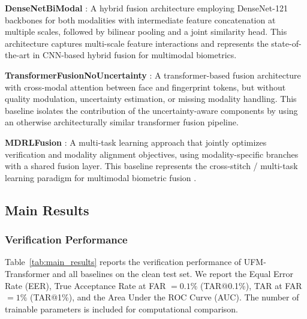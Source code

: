 \documentclass[10pt,journal,compsoc]{IEEEtran}
\begin{document}
\textbf{DenseNetBiModal} \cite{ren2022dataset}: A hybrid fusion architecture employing DenseNet-121 backbones for both modalities with intermediate feature concatenation at multiple scales, followed by bilinear pooling and a joint similarity head. This architecture captures multi-scale feature interactions and represents the state-of-the-art in CNN-based hybrid fusion for multimodal biometrics.

\textbf{TransformerFusionNoUncertainty} \cite{yang2024authformer}: A transformer-based fusion architecture with cross-modal attention between face and fingerprint tokens, but without quality modulation, uncertainty estimation, or missing modality handling. This baseline isolates the contribution of the uncertainty-aware components by using an otherwise architecturally similar transformer fusion pipeline.

\textbf{MDRLFusion} \cite{goh2022framework}: A multi-task learning approach that jointly optimizes verification and modality alignment objectives, using modality-specific branches with a shared fusion layer. This baseline represents the cross-stitch / multi-task learning paradigm for multimodal biometric fusion \cite{misra2016crossstitch}.

\subsection{Main Results}
\label{subsec:main_results}

\subsubsection{Verification Performance} Table~\ref{tab:main_results} reports the verification performance of UFM-Transformer and all baselines on the clean test set. We report the Equal Error Rate (EER), True Acceptance Rate at FAR $= 0.1\%$ (TAR@0.1\%), TAR at FAR $= 1\%$ (TAR@1\%), and the Area Under the ROC Curve (AUC). The number of trainable parameters is included for computational comparison.
\end{document}
